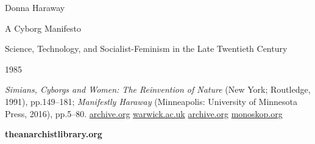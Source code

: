 \documentclass[DIV=12,%
               BCOR=10mm,%
               headinclude=false,%
               footinclude=false,open=any,%
               fontsize=11pt,%
               twoside,%
               paper=210mm:11in]%
               {scrbook}
\begin{document}
\begin{center}


Donna Haraway

A Cyborg Manifesto

Science, Technology, and Socialist-Feminism in the Late Twentieth Century

1985


\bigskip


\emph{Simians, Cyborgs and Women: The Reinvention of Nature} (New York; Routledge, 1991), pp.149–181; \emph{Manifestly Haraway} (Minneapolis: University of Minnesota Press, 2016), pp.5–80. \href{https://archive.org/details/manifestlyharawaythecyborgmanifestothecompanionspeciesmanifestorepubblicanesimogeopolitico/page/n17}{archive.org} \href{https://warwick.ac.uk/fac/arts/english/currentstudents/undergraduate/modules/fictionnownarrativemediaandtheoryinthe21stcentury/manifestly\_haraway\_----\_a\_cyborg\_manifesto\_science\_technology\_and\_socialist-feminism\_in\_the\_....pdf}{warwick.ac.uk} \href{https://archive.org/details/harawaydonnajsimianscyborgsandwomenthereinventionofnature/page/n169}{archive.org} \href{https://monoskop.org/images/f/f3/Haraway\_Donna\_J\_Simians\_Cyborgs\_and\_Women\_The\_Reinvention\_of\_Nature.pdf\#page=171}{monoskop.org}
   

       

       

       

       

       

       

   



\bigskip
\textbf{theanarchistlibrary.org}


\end{center}



\end{document}
